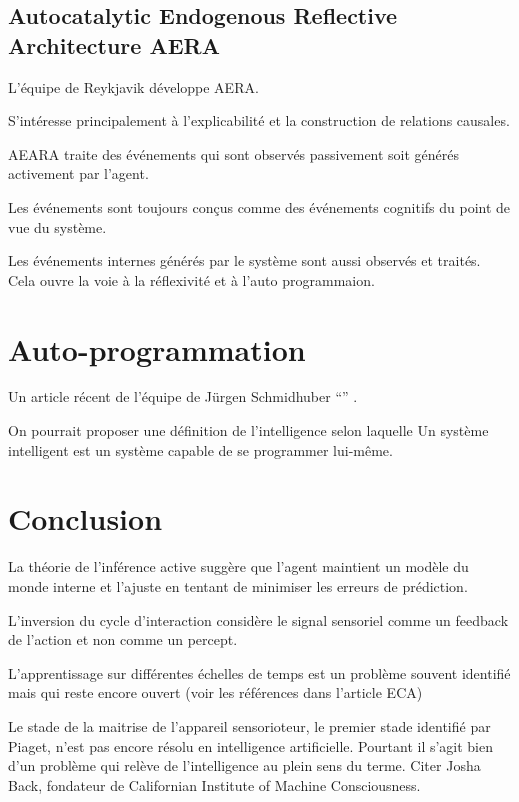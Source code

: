 \subsection{Autocatalytic Endogenous Reflective Architecture AERA}

L'équipe de Reykjavik développe AERA. 

S'intéresse principalement à l'explicabilité et la construction de relations causales. 

AEARA traite des événements qui sont observés passivement soit générés activement par l'agent. 

Les événements sont toujours conçus comme des événements cognitifs du point de vue du système.

Les événements internes générés par le système sont aussi observés et traités. 
Cela ouvre la voie à la réflexivité et à l'auto programmaion.




\section{Auto-programmation}

Un article récent de l'équipe de Jürgen Schmidhuber ``'' \cite{wang_huxley-gomachine_2025}.

On pourrait proposer une définition de l'intelligence selon laquelle Un système intelligent est un système capable de se programmer lui-même.




\section{Conclusion}


La théorie de l'inférence active suggère que l'agent maintient un modèle du monde interne et l'ajuste en tentant de minimiser les erreurs de prédiction.

L'inversion du cycle d'interaction considère le signal sensoriel comme un feedback de l'action et non comme un percept.


L'apprentissage sur différentes échelles de temps est un problème souvent identifié mais qui reste encore ouvert 
(voir les références dans l'article ECA)

Le stade de la maitrise de l'appareil sensorioteur, le premier stade identifié par Piaget, n'est pas encore résolu en intelligence artificielle. Pourtant il s'agit bien d'un problème qui relève de l'intelligence au plein sens du terme. Citer Josha Back, fondateur de Californian Institute of Machine Consciousness.



